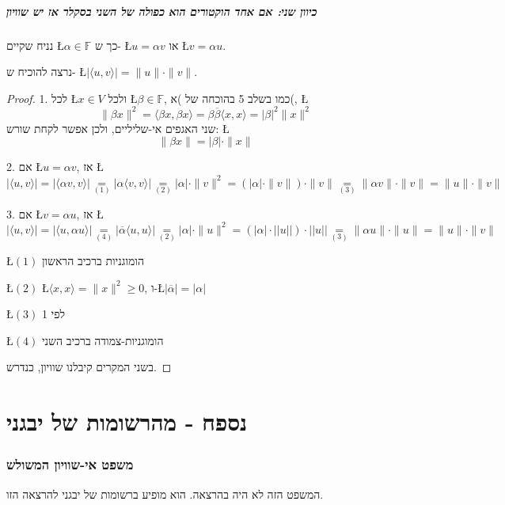 \documentclass[english,hebrew]{article}
\begin{document}
\subsubsection{כיוון שני: אם אחד הוקטורים הוא כפולה של השני בסקלר אז יש שוויון}

נניח שקיים \L{$\alpha\in\mathbb{F}$} כך ש- \L{$u=\alpha v$} או \L{$v=\alpha u$}.

נרצה להוכיח ש- \L{$\left|\langle u,v\rangle\right|=\|u\|\cdot\|v\|$}.
\begin{proof}
1. לכל \L{$x\in V$} ולכל \L{$\beta\in\mathbb{F}$}, כמו בשלב 5 בהוכחה
של )א(, \L{%
\[
\|\beta x\|^{2}=\langle\beta x,\beta x\rangle=\beta\overline{\beta}\langle x,x\rangle=|\beta|^{2}\|x\|^{2}
\]
}%
שני האגפים אי-שליליים, ולכן אפשר לקחת שורש: \L{%
\[
\|\beta x\|=|\beta|\cdot\|x\|
\]
}%

2. אם \L{$u=\alpha v$}, אז \L{%
\[
\left|\langle u,v\rangle\right|=\left|\langle\alpha v,v\rangle\right|\underset{(1)}{=}\left|\alpha\langle v,v\rangle\right|\underset{(2)}{=}|\alpha|\cdot\|v\|^{2}=\left(|\alpha|\cdot\|v\|\right)\cdot\|v\|\underset{(3)}{=}\|\alpha v\|\cdot\|v\|=\|u\|\cdot\|v\|
\]
}%

3. אם \L{$v=\alpha u$}, אז \L{%
\[
\left|\langle u,v\rangle\right|=\left|\langle u,\alpha u\rangle\right|\underset{(4)}{=}\left|\overline{\alpha}\langle u,u\rangle\right|\underset{(2)}{=}|\alpha|\cdot\|u\|^{2}=\left(\left|\alpha\right|\cdot\left|\left|u\right|\right|\right)\cdot\left|\left|u\right|\right|\underset{(3)}{=}\|\alpha u\|\cdot\|u\|=\|u\|\cdot\|v\|
\]
}%

\L{$(1)$} הומוגניות ברכיב הראשון

\L{$(2)$} \L{$\langle x,x\rangle=\|x\|^{2}\geq0$}, ו-\L{$|\overline{\alpha}|=|\alpha|$}

\L{$(3)$} לפי 1

\L{$(4)$} הומוגניות-צמודה ברכיב השני

בשני המקרים קיבלנו שוויון, כנדרש. 
\end{proof}

\part{נספח - מהרשומות של יבגני}

\section{משפט אי-שוויון המשולש}

המשפט הזה לא היה בהרצאה. הוא מופיע ברשומות של יבגני להרצאה הזו.
\end{document}
